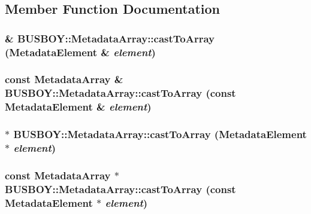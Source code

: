 \subsection{Member Function Documentation}
\hypertarget{classBUSBOY_1_1MetadataArray_ac781983bfc76925f984ff80ef8cab48e}{
\subsubsection[{castToArray}]{ \& BUSBOY::MetadataArray::castToArray ({\bf MetadataElement} \& {\em element})}}
\label{classBUSBOY_1_1MetadataArray_ac781983bfc76925f984ff80ef8cab48e}
\hypertarget{classBUSBOY_1_1MetadataArray_a2da445849ae2d8418a3faa9e1de3db34}{
\subsubsection[{castToArray}]{\setlength{\rightskip}{0pt plus 5cm}const {\bf MetadataArray} \& BUSBOY::MetadataArray::castToArray (const {\bf MetadataElement} \& {\em element})}}
\label{classBUSBOY_1_1MetadataArray_a2da445849ae2d8418a3faa9e1de3db34}
\hypertarget{classBUSBOY_1_1MetadataArray_a69ac33f7167793f256c10de730140942}{
\subsubsection[{castToArray}]{ $\ast$ BUSBOY::MetadataArray::castToArray ({\bf MetadataElement} $\ast$ {\em element})}}
\label{classBUSBOY_1_1MetadataArray_a69ac33f7167793f256c10de730140942}
\hypertarget{classBUSBOY_1_1MetadataArray_a6887226ffdbb385933776c98e80f53f6}{
\subsubsection[{castToArray}]{\setlength{\rightskip}{0pt plus 5cm}const {\bf MetadataArray} $\ast$ BUSBOY::MetadataArray::castToArray (const {\bf MetadataElement} $\ast$ {\em element})}}
